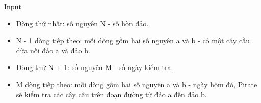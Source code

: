 Input  
\begin{itemize}
	\item     Dòng thứ nhất: số nguyên N - số hòn đảo.   
	\item     N - 1 dòng tiếp theo: mỗi dòng gồm hai số nguyên a và b - có một cây cầu dừa nối đảo a và đảo b.   
	\item     Dòng thứ N + 1: số nguyên M - số ngày kiểm tra.   
	\item     M dòng tiếp theo: mỗi dòng gồm hai số nguyên a và b - ngày hôm đó, Pirate sẽ kiểm tra các cây cầu trên đoạn đường từ đảo a đến đảo b.   
\end{itemize}